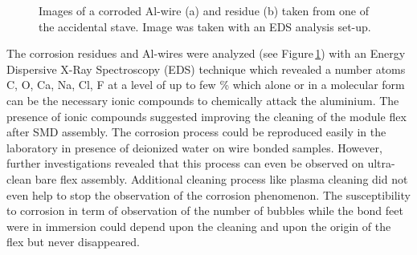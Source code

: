  \begin{figure}
        \centering
        \caption{Images of a corroded Al-wire (a) and residue (b) taken from one of the accidental stave. Image was taken with an EDS analysis set-up.}
        \label{fig:wire-corrosion_EDS}
\end{figure}
The corrosion residues and Al-wires were analyzed (see Figure\,\ref{fig:wire-corrosion_EDS}) with an Energy Dispersive X-Ray Spectroscopy (EDS) technique which revealed a number atoms C, O, Ca, Na, Cl, F at a level of up to few \% which alone or in a molecular form can be the necessary ionic compounds to chemically attack the aluminium.
The presence of ionic compounds suggested improving the cleaning of the module flex after SMD assembly. The corrosion process could be reproduced easily in the laboratory in presence of deionized water on wire bonded samples. However, further investigations revealed that this process can even be observed on ultra-clean bare flex assembly.  Additional cleaning process like plasma cleaning did not even help to stop the observation of the corrosion phenomenon. The susceptibility to corrosion in term of observation of the number of bubbles while the bond feet were in immersion could depend upon the cleaning and upon the origin of the flex but never disappeared.

